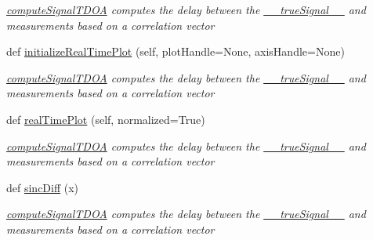 \begin{DoxyCompactItemize}
\begin{DoxyCompactList}\small\item\em \hyperlink{classmodest_1_1substates_1_1correlationvector_1_1CorrelationVector_a93ab1b2a798ddca9f1557557c7bc35fc}{compute\+Signal\+T\+D\+OA} computes the delay between the \hyperlink{classmodest_1_1substates_1_1correlationvector_1_1CorrelationVector_af2f52cea1c695f36dd100f529c322e94}{\+\_\+\+\_\+true\+Signal\+\_\+\+\_\+} and measurements based on a correlation vector \end{DoxyCompactList}\item 
def \hyperlink{classmodest_1_1substates_1_1correlationvector_1_1CorrelationVector_a6dfc3dd0c5ceaf8427bcaeb89a7f3d30}{initialize\+Real\+Time\+Plot} (self, plot\+Handle=None, axis\+Handle=None)
\begin{DoxyCompactList}\small\item\em \hyperlink{classmodest_1_1substates_1_1correlationvector_1_1CorrelationVector_a93ab1b2a798ddca9f1557557c7bc35fc}{compute\+Signal\+T\+D\+OA} computes the delay between the \hyperlink{classmodest_1_1substates_1_1correlationvector_1_1CorrelationVector_af2f52cea1c695f36dd100f529c322e94}{\+\_\+\+\_\+true\+Signal\+\_\+\+\_\+} and measurements based on a correlation vector \end{DoxyCompactList}\item 
def \hyperlink{classmodest_1_1substates_1_1correlationvector_1_1CorrelationVector_ad59577dd3219b724a9a8680a706eb242}{real\+Time\+Plot} (self, normalized=True)
\begin{DoxyCompactList}\small\item\em \hyperlink{classmodest_1_1substates_1_1correlationvector_1_1CorrelationVector_a93ab1b2a798ddca9f1557557c7bc35fc}{compute\+Signal\+T\+D\+OA} computes the delay between the \hyperlink{classmodest_1_1substates_1_1correlationvector_1_1CorrelationVector_af2f52cea1c695f36dd100f529c322e94}{\+\_\+\+\_\+true\+Signal\+\_\+\+\_\+} and measurements based on a correlation vector \end{DoxyCompactList}\item 
def \hyperlink{classmodest_1_1substates_1_1correlationvector_1_1CorrelationVector_a033e07143d7a0aeefb3136d42a380ee3}{sinc\+Diff} (x)
\begin{DoxyCompactList}\small\item\em \hyperlink{classmodest_1_1substates_1_1correlationvector_1_1CorrelationVector_a93ab1b2a798ddca9f1557557c7bc35fc}{compute\+Signal\+T\+D\+OA} computes the delay between the \hyperlink{classmodest_1_1substates_1_1correlationvector_1_1CorrelationVector_af2f52cea1c695f36dd100f529c322e94}{\+\_\+\+\_\+true\+Signal\+\_\+\+\_\+} and measurements based on a correlation vector \end{DoxyCompactList}\item 

\end{DoxyCompactItemize}
